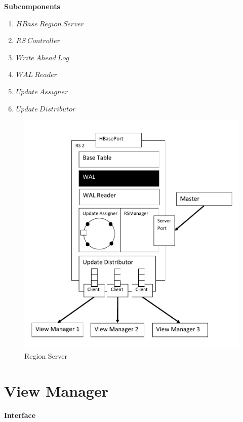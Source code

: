 \textbf{Subcomponents}

\begin{enumerate}
	\item $HBase\:Region\:Server$
	\item $RS\:Controller$
	\item $Write\:Ahead\:Log$
	\item $WAL\:Reader$
	\item $Update\:Assigner$
	\item $Update\:Distributor$
\end{enumerate}

\newpage
\begin{figure}[h!]
  
  \centering
    \includegraphics[scale=0.8]{figures/RegionServer}
    \caption{Region Server}
    \label{fig:regionserverAppendix}
\end{figure}
\newpage

\section{View Manager}



\textbf{Interface}

